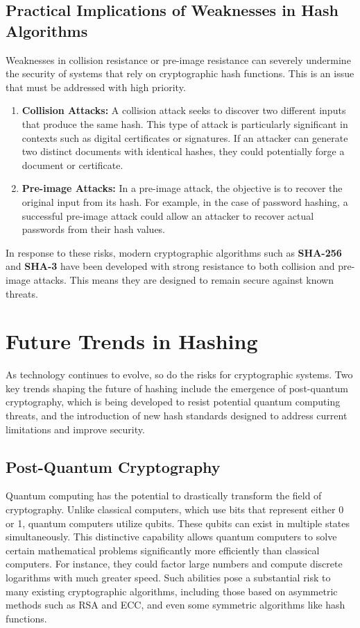\documentclass[11pt,a4paper]{article}
\begin{document}
    \subsection*{Practical Implications of Weaknesses in Hash Algorithms}
    Weaknesses in collision resistance or pre-image resistance can severely undermine the security of systems that rely on cryptographic hash functions. This is an issue that must be addressed with high priority.

        \begin{enumerate}
            \item \textbf{Collision Attacks:} A collision attack seeks to discover two different inputs that produce the same hash. This type of attack is particularly significant in contexts such as digital certificates or signatures. If an attacker can generate two distinct documents with identical hashes, they could potentially forge a document or certificate.

            \item \textbf{Pre-image Attacks:} In a pre-image attack, the objective is to recover the original input from its hash. For example, in the case of password hashing, a successful pre-image attack could allow an attacker to recover actual passwords from their hash values.

        \end{enumerate}
        In response to these risks, modern cryptographic algorithms such as \textbf{SHA-256} and \textbf{SHA-3} have been developed with strong resistance to both collision and pre-image attacks. This means they are designed to remain secure against known threats.

\section*{Future Trends in Hashing}
As technology continues to evolve, so do the risks for cryptographic systems. Two key trends shaping the future of hashing include the emergence of post-quantum cryptography, which is being developed to resist potential quantum computing threats, and the introduction of new hash standards designed to address current limitations and improve security.
    \subsection*{Post-Quantum Cryptography}
    Quantum computing has the potential to drastically transform the field of cryptography. Unlike classical computers, which use bits that represent either 0 or 1, quantum computers utilize qubits. These qubits can exist in multiple states simultaneously. This distinctive capability allows quantum computers to solve certain mathematical problems significantly more efficiently than classical computers. For instance, they could factor large numbers and compute discrete logarithms with much greater speed. Such abilities pose a substantial risk to many existing cryptographic algorithms, including those based on asymmetric methods such as RSA and ECC, and even some symmetric algorithms like hash functions.
\end{document}
